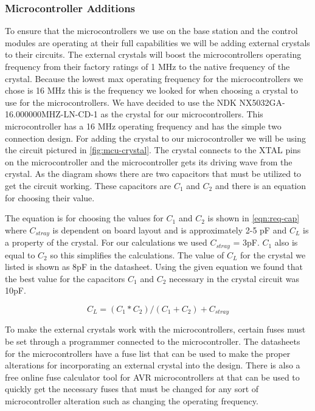 \subsubsection{Microcontroller Additions}
To ensure that the microcontrollers we use on the base station and the control
modules are operating at their full capabilities we will be adding external
crystals to their circuits. The external crystals will boost the
microcontrollers operating frequency from their factory ratings of 1 MHz to the
native frequency of the crystal.  Because the lowest max operating frequency
for the microcontrollers we chose is 16 MHz this is the frequency we looked for
when choosing a crystal to use for the microcontrollers. We have decided to use
the NDK NX5032GA{}-16.000000MHZ{}-LN{}-CD{}-1 as the crystal for our
microcontrollers. This microcontroller has a 16 MHz operating frequency and has
the simple two connection design. For adding the crystal to our microcontroller
we will be using the circuit pictured in \autoref{fig:mcu-crystal}. The crystal
connects to the XTAL pins on the microcontroller and the microcontroller gets
its driving wave from the crystal. As the diagram shows there are two
capacitors that must be utilized to get the circuit working. These capacitors
are $C_{1}$ and $C_{2}$ and there is an equation for
choosing their value.


The equation is for choosing the values for $C_{1}$ and
$C_{2}$ is shown in \autoref{eqn:req-cap} where
$C_{stray}$ is dependent on board layout and is approximately 2-5 pF
and $C_{L}$ is a property of the crystal. For our calculations we
used $C_{stray}$ = 3pF. $C_{1}$ also is equal to
$C_{2}$ so this simplifies the calculations. The value of
$C_{L}$ for the crystal we listed is shown as 8pF in the datasheet.
Using the given equation we found that the best value for the capacitors
$C_{1}$ and $C_{2}$ necessary in the crystal circuit was
10pF.

\begin{equation}
  C_{L} = (C_1 * C_2) / (C_1+C_2) + C_{stray}
\label{eqn:req-cap}
\end{equation}

To make the external crystals work with the microcontrollers, certain fuses
must be set through a programmer connected to the microcontroller. The
datasheets for the microcontrollers have a fuse list that can be used to make
the proper alterations for incorporating an external crystal into the design.
There is also a free online fuse calculator tool for AVR microcontrollers at
\cite{link2} that can be used to quickly get the
necessary fuses that must be changed for any sort of microcontroller alteration
such as changing the operating frequency.

